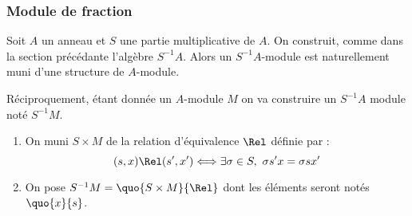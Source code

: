 \subsubsection{Module de fraction}
\vspace{0.5em}

Soit $A$ un anneau et $S$ une partie multiplicative de $A$. On construit, comme
dans la section précédante l'algèbre $S^{-1}A$. Alors un $S^{-1}A$-module est
naturellement muni d'une structure de $A$-module.

Réciproquement, étant donnée un $A$-module $M$ on va construire un $S^{-1}A$
module noté $S^{-1}M$.

\begin{enumerate}
 \item On muni $S\times M$ de la relation d'équivalence $\Rel$ définie par :
\begin{displaymath}
 (s,x) \Rel (s',x') \Longleftrightarrow \exists \sigma \in S,\ 
 \sigma s' x = \sigma s x'
\end{displaymath}
\item On pose $S^{-1}M = \quo{S\times M}{\Rel}$ dont les éléments seront notés
$\quo{x}{s}$.
\end{enumerate}











 















